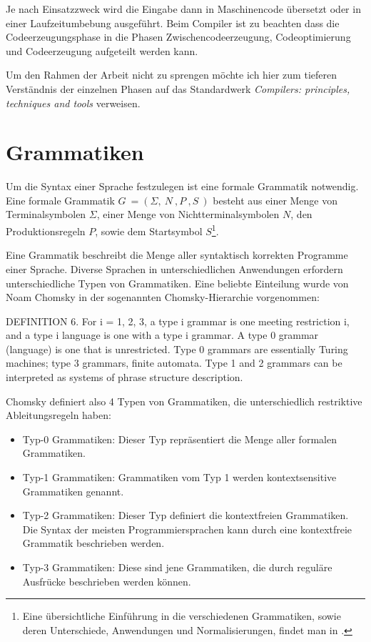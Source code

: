 Je nach Einsatzzweck wird die Eingabe dann in Maschinencode übersetzt oder in einer Laufzeitumbebung ausgeführt. Beim Compiler ist zu beachten dass die Codeerzeugungsphase in die Phasen Zwischencodeerzeugung, Codeoptimierung und Codeerzeugung aufgeteilt werden kann. 

Um den Rahmen der Arbeit nicht zu sprengen möchte ich hier zum tieferen Verständnis der einzelnen Phasen auf das Standardwerk \emph{Compilers: principles, techniques and tools} \cite{AhSe86} verweisen.


\section{Grammatiken}

Um die Syntax einer Sprache festzulegen ist eine formale Grammatik not\-wen\-dig. Eine formale Grammatik $G \ = (\Sigma,\ N\ ,P\ ,S\ )$ besteht aus einer Menge von Terminalsymbolen $\Sigma$, einer Menge von Nichtterminalsymbolen $N$, den Produktionsregeln $P$, sowie dem Startsymbol $S$\footnote{Eine übersichtliche Ein\-füh\-rung in die verschiedenen Grammatiken, sowie deren Unterschiede, Anwendungen und Normalisierungen, findet man in \cite{VoWi02}.}.

Eine Grammatik beschreibt die Menge aller syntaktisch korrekten Programme einer Sprache. Diverse Sprachen in unterschiedlichen Anwendungen erfordern unterschiedliche Typen von Grammatiken. Eine beliebte Einteilung wurde von Noam Chomsky in der sogenannten Chomsky-Hierarchie vorgenommen:

\begin{myquote}DEFINITION 6. For i = 1, 2, 3, a type i grammar is one meeting restriction i, and a type i language is one with a type i grammar. A type 0 grammar (language) is one that is unrestricted. 
Type 0 grammars are essentially Turing machines; type 3 grammars, finite automata. Type 1 and 2 grammars can be interpreted as systems of phrase structure description. \cite{Chom59}
\end{myquote}

Chomsky definiert also 4 Typen von Grammatiken, die unterschiedlich restriktive Ab\-lei\-tungs\-re\-geln haben:

\begin{itemize}
  \item Typ-0 Grammatiken: Dieser Typ repräsentiert die Menge aller formalen Grammatiken.
  \item Typ-1 Grammatiken: Grammatiken vom Typ 1 werden kontextsensitive Grammatiken genannt.
  \item Typ-2 Grammatiken: Dieser Typ definiert die kontextfreien Grammatiken. Die Syntax der meisten Programmiersprachen kann durch eine kontextfreie Grammatik beschrieben werden.
  \item Typ-3 Grammatiken: Diese sind jene Grammatiken, die durch reguläre Ausfrücke beschrieben werden können.
\end{itemize}

